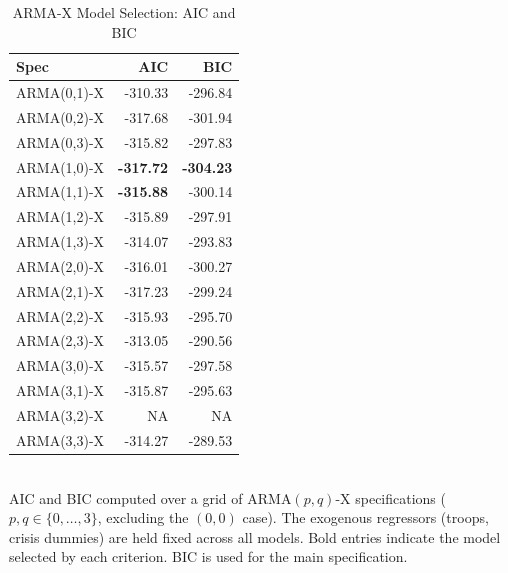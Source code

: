 \begin{table}[htbp]
  \centering
  \caption{ARMA-X Model Selection: AIC and BIC}
  \label{tab:model_selection}
  \begin{tabular}{lrr}
    \toprule
    Spec & AIC & BIC \\
    \midrule
    ARMA(0,1)-X & -310.33 & -296.84 \\
    ARMA(0,2)-X & -317.68 & -301.94 \\
    ARMA(0,3)-X & -315.82 & -297.83 \\
    ARMA(1,0)-X & \textbf{-317.72} & \textbf{-304.23}} \\
    ARMA(1,1)-X & \textbf{-315.88} & -300.14 \\
    ARMA(1,2)-X & -315.89 & -297.91 \\
    ARMA(1,3)-X & -314.07 & -293.83 \\
    ARMA(2,0)-X & -316.01 & -300.27 \\
    ARMA(2,1)-X & -317.23 & -299.24 \\
    ARMA(2,2)-X & -315.93 & -295.70 \\
    ARMA(2,3)-X & -313.05 & -290.56 \\
    ARMA(3,0)-X & -315.57 & -297.58 \\
    ARMA(3,1)-X & -315.87 & -295.63 \\
    ARMA(3,2)-X & NA & NA \\
    ARMA(3,3)-X & -314.27 & -289.53 \\
    \bottomrule
  \end{tabular}
  \\[2pt] \footnotesize{AIC and BIC computed over a grid of ARMA$(p,q)$-X specifications ($p, q \in \{0,\ldots,3\}$, excluding the $(0,0)$ case). The exogenous regressors (troops, crisis dummies) are held fixed across all models. Bold entries indicate the model selected by each criterion. BIC is used for the main specification.}
\end{table}

